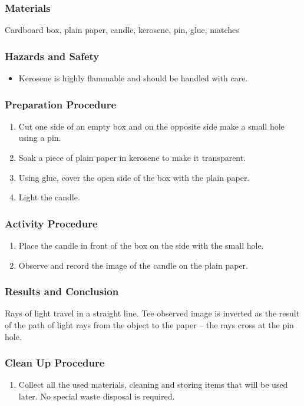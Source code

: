 \subsubsection*{Materials}
Cardboard box, plain paper, candle, kerosene, pin, glue, matches

\subsubsection*{Hazards and Safety}
\begin{itemize}
\item{Kerosene is highly flammable and should be handled with care.} 
\end{itemize}

\subsubsection*{Preparation Procedure}
\begin{enumerate}
\item{Cut one side of an empty box and on the opposite side make a small hole using a pin.} 
\item{Soak a piece of plain paper in kerosene to make it transparent.} 
\item{Using glue, cover the open side of the box with the plain paper.} 
\item{Light the candle.} 
\end{enumerate}

\subsubsection*{Activity Procedure}
\begin{enumerate}
\item{Place the candle in front of the box on the side with the small hole.} 
\item{Observe and record the image of the candle on the plain paper.} 
\end{enumerate}

\subsubsection*{Results and Conclusion}
Rays of light travel in a straight line. Tee observed image is inverted as the result of the path of light rays from the object to the paper -- the rays cross at the pin hole.

\subsubsection*{Clean Up Procedure}
\begin{enumerate}
\item{Collect all the used materials, cleaning and storing items that will be used later. No special waste disposal is required.} 
\end{enumerate}

